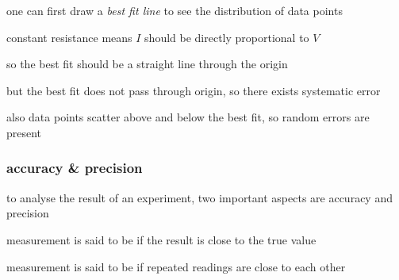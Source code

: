 
\sol one can first draw a \emph{best fit line} to see the distribution of data points

constant resistance means $I$ should be directly proportional to $V$

so the best fit should be a straight line through the origin

but the best fit does not pass through origin, so there exists systematic error

also data points scatter above and below the best fit, so random errors are present \eoe


\subsubsection{accuracy \& precision}

to analyse the result of an experiment, two important aspects are accuracy and precision

\begin{ilight}
	\centering measurement is said to be  if the result is close to the true value
\end{ilight}

\begin{ilight}
	\centering measurement is said to be  if repeated readings are close to each other
\end{ilight}

